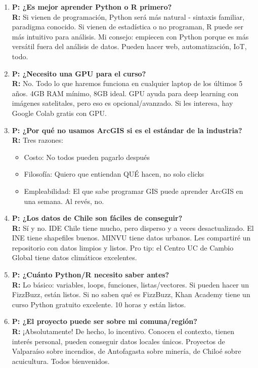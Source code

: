 \documentclass[11pt,a4paper]{article}
\begin{document}
\begin{enumerate}
\item \textbf{P: ¿Es mejor aprender Python o R primero?}\\
\textbf{R:} Si vienen de programación, Python será más natural - sintaxis familiar, paradigma conocido. Si vienen de estadística o no programan, R puede ser más intuitivo para análisis. Mi consejo: empiecen con Python porque es más versátil fuera del análisis de datos. Pueden hacer web, automatización, IoT, todo.

\item \textbf{P: ¿Necesito una GPU para el curso?}\\
\textbf{R:} No. Todo lo que haremos funciona en cualquier laptop de los últimos 5 años. 4GB RAM mínimo, 8GB ideal. GPU ayuda para deep learning con imágenes satelitales, pero eso es opcional/avanzado. Si les interesa, hay Google Colab gratis con GPU.

\item \textbf{P: ¿Por qué no usamos ArcGIS si es el estándar de la industria?}\\
\textbf{R:} Tres razones: 
\begin{itemize}
    \item Costo: No todos pueden pagarlo después
    \item Filosofía: Quiero que entiendan QUÉ hacen, no solo clicks
    \item Empleabilidad: El que sabe programar GIS puede aprender ArcGIS en una semana. Al revés, no.
\end{itemize}

\item \textbf{P: ¿Los datos de Chile son fáciles de conseguir?}\\
\textbf{R:} Sí y no. IDE Chile tiene mucho, pero disperso y a veces desactualizado. El INE tiene shapefiles buenos. MINVU tiene datos urbanos. Les compartiré un repositorio con datos limpios y listos. Pro tip: el Centro UC de Cambio Global tiene datos climáticos excelentes.

\item \textbf{P: ¿Cuánto Python/R necesito saber antes?}\\
\textbf{R:} Lo básico: variables, loops, funciones, listas/vectores. Si pueden hacer un FizzBuzz, están listos. Si no saben qué es FizzBuzz, Khan Academy tiene un curso Python gratuito excelente. 10 horas y están listos.

\item \textbf{P: ¿El proyecto puede ser sobre mi comuna/región?}\\
\textbf{R:} ¡Absolutamente! De hecho, lo incentivo. Conocen el contexto, tienen interés personal, pueden conseguir datos locales únicos. Proyectos de Valparaíso sobre incendios, de Antofagasta sobre minería, de Chiloé sobre acuicultura. Todos bienvenidos.


\end{enumerate}
\end{document}
